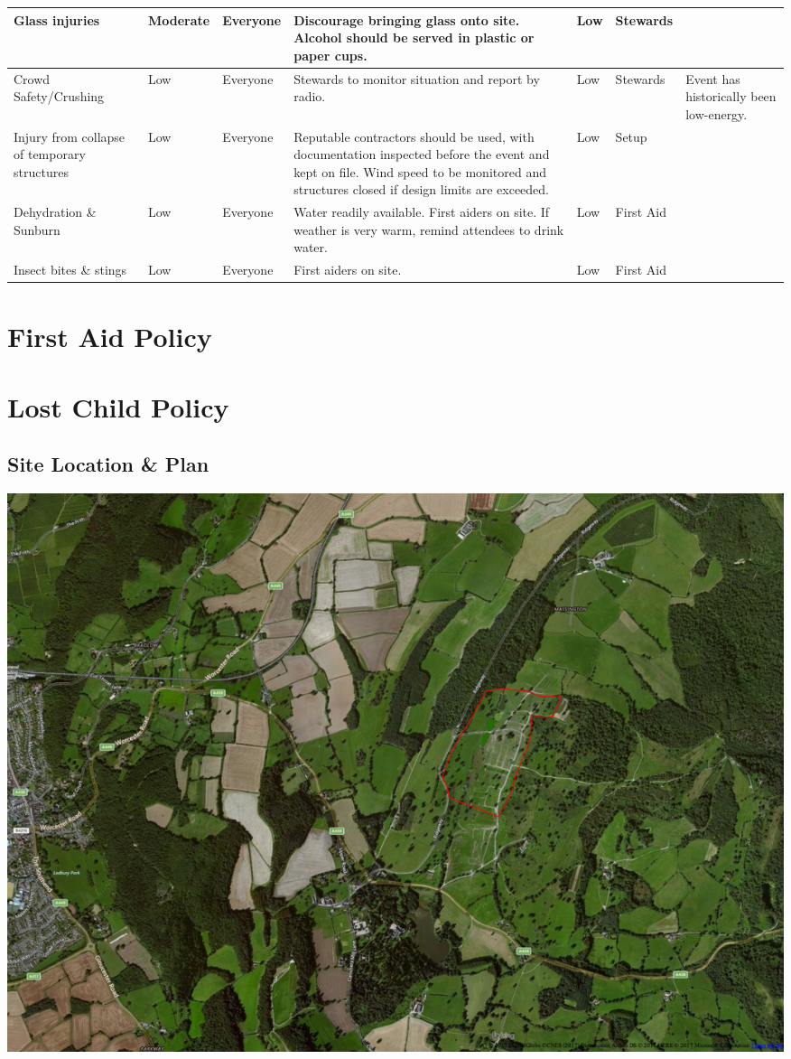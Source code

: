 \begin{landscape}
\begin{tabular}{| p{3cm} | l | p{1.5cm} | p{9cm} | p{1.5cm} | p{2cm} | p{6cm} |}
Glass injuries & Moderate & Everyone &
Discourage bringing glass onto site. Alcohol should be served in plastic or paper cups. &
Low & Stewards & \\ \hline

Crowd Safety/Crushing & Low & Everyone &
Stewards to monitor situation and report by radio. &
Low & Stewards & Event has historically been low-energy. \\ \hline

Injury from collapse of temporary structures & Low & Everyone &
Reputable contractors should be used, with documentation inspected before the event and kept on file.
Wind speed to be monitored and structures closed if design limits are exceeded. &
Low & Setup & \\ \hline

Dehydration \& Sunburn & Low & Everyone &
Water readily available. First aiders on site. If weather is very warm, remind attendees to drink water.
& Low & First Aid & \\ \hline

Insect bites \& stings & Low & Everyone &
First aiders on site. & Low & First Aid & \\ \hline

\end{tabular}

\end{landscape}
\restoregeometry

\appendix

\section{First Aid Policy}
\label{first-aid-policy}

\newpage

\section{Lost Child Policy}
\label{lost-child-policy}

\pagestyle{empty}
\begin{landscape}
\section{Site Location \& Plan}
\label{site-plan}
\includegraphics[width=25cm]{./supplementary/wide-map.png}
\end{landscape}
